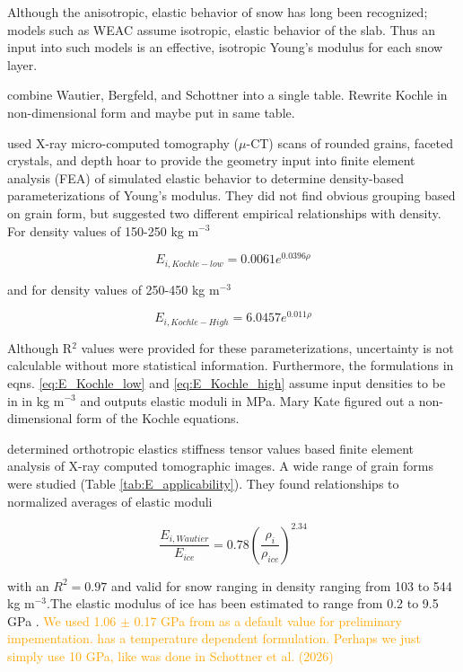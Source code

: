 \documentclass[journal abbreviation, manuscript]{copernicus}
\begin{document}
Although the anisotropic, elastic behavior of snow has long been recognized; models such as WEAC assume isotropic, elastic behavior of the slab. Thus an input into such models is an effective, isotropic Young's modulus for each snow layer.

\textcolor{YellowOrange}{combine Wautier, Bergfeld, and Schottner into a single table. Rewrite Kochle in non-dimensional form and maybe put in same table.}

\citet{kochle2014} used X-ray micro-computed tomography ($\mu$-CT) scans of rounded grains, faceted crystals, and depth hoar to provide the geometry input into finite element analysis (FEA) of simulated elastic behavior to determine density-based parameterizations of Young's modulus. They did not find obvious grouping based on grain form, but suggested two different empirical relationships with density. For density values of 150-250 kg m$^{-3}$

\begin{equation}
\label{eq:E_Kochle_low}
    E_{i, Kochle-low} =0.0061 e^{0.0396\rho}
\end{equation}

and for density values of 250-450 kg m$^{-3}$

\begin{equation}
\label{eq:E_Kochle_high}
    E_{i, Kochle-High} =6.0457 e^{0.011\rho}
\end{equation}

Although R$^2$ values were provided for these parameterizations, uncertainty is not calculable without more statistical information. Furthermore, the formulations in eqns. \ref{eq:E_Kochle_low} and \ref{eq:E_Kochle_high} assume input densities to be in in kg  m$^{-3}$ and outputs elastic moduli in MPa. \textcolor{RubineRed}{Mary Kate figured out a non-dimensional form of the Kochle equations.}

\citet{wautier2015} determined orthotropic elastics stiffness tensor values based finite element analysis of X-ray computed tomographic images. A wide range of grain forms were studied (Table \ref{tab:E_applicability}).  They found relationships to normalized averages of elastic moduli

\begin{equation}
    \label{eq:E_wautier}
    \frac{E_{i, Wautier}}{E_{ice}}=0.78(\frac{\rho_{i}}{\rho_{ice}})^{2.34}
\end{equation}

with an $R^2=0.97$ and valid for snow ranging in density ranging from 103 to 544 kg m$^{-3}$.The elastic modulus of ice has been estimated to range from 0.2 to 9.5 GPa \citep{chandel2014}. \textcolor{Orange}{We used 1.06 $\pm$ 0.17 GPa from \citet{kermani_bending_2008} as a default value for preliminary impementation. \citet{schulson2009} has a temperature dependent formulation. Perhaps we just simply use 10 GPa, like was done in Schottner et al. (2026) } 
\end{document}

